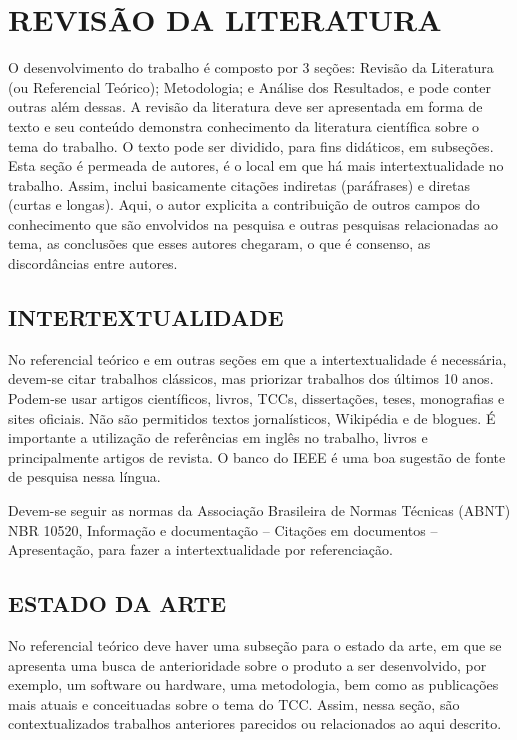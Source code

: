 \chapter{REVISÃO DA LITERATURA}\label{chp:REVISAO}

O desenvolvimento do trabalho é composto por 3 seções: Revisão da Literatura (ou Referencial Teórico); Metodologia; e Análise dos Resultados, e pode conter outras além dessas. A revisão da literatura deve ser apresentada em forma de texto e seu conteúdo demonstra conhecimento da literatura científica sobre o tema do trabalho. O texto pode ser dividido, para fins didáticos, em subseções. Esta seção é permeada de autores, é o local em que há mais intertextualidade no trabalho. Assim, inclui basicamente citações indiretas (paráfrases) e diretas (curtas e longas). Aqui, o autor explicita a contribuição de outros campos do conhecimento que são envolvidos na pesquisa e outras pesquisas relacionadas ao tema, as conclusões que esses autores chegaram, o que é consenso, as discordâncias entre autores. 


\section{INTERTEXTUALIDADE}\label{sec:INTERTEXTUALIDADE}
No referencial teórico e em outras seções em que a intertextualidade é necessária, devem-se citar trabalhos clássicos, mas priorizar trabalhos dos últimos 10 anos. Podem-se usar artigos científicos, livros, TCCs, dissertações, teses, monografias e sites oficiais. Não são permitidos textos jornalísticos, Wikipédia e de blogues. É importante a utilização de referências em inglês no trabalho, livros e principalmente artigos de revista. O banco do IEEE é uma boa sugestão de fonte de pesquisa nessa língua. 

Devem-se seguir as normas da Associação Brasileira de Normas Técnicas (ABNT)  NBR 10520, Informação e documentação – Citações em documentos – Apresentação,  para fazer a intertextualidade por referenciação. 

\section{ESTADO DA ARTE}\label{sec:ESTADOARTE}

No referencial teórico deve haver uma subseção para o estado da arte, em que se apresenta uma busca de anterioridade sobre o produto a ser desenvolvido, por exemplo, um software ou hardware, uma metodologia, bem como as publicações mais atuais e conceituadas sobre o tema do TCC. Assim, nessa seção, são contextualizados trabalhos anteriores parecidos ou relacionados ao aqui descrito. 

